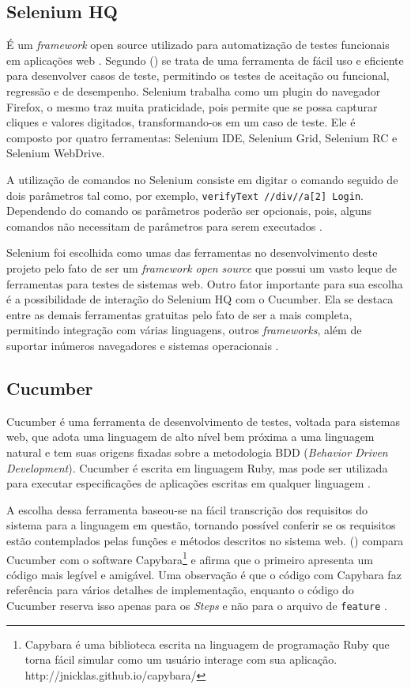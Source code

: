 \documentclass[tg]{mdtufsm}
\begin{document}
\subsection{Selenium HQ}
É um \emph{framework} open source utilizado para automatização de testes funcionais em aplicações web \cite{chiavegatto1desenvolvimento}. Segundo \citeauthor{pereiraestudoselenium} (\citeyear{pereiraestudoselenium}) se trata
de uma ferramenta de fácil uso e eficiente para desenvolver casos de teste, permitindo os testes de aceitação ou funcional, regressão e de desempenho.
Selenium trabalha como um plugin do navegador Firefox, o mesmo traz muita praticidade, pois permite que se possa capturar cliques e valores digitados, transformando-os em um caso de teste. Ele é composto por
quatro ferramentas: Selenium IDE, Selenium Grid, Selenium RC e Selenium WebDrive.

A utilização de comandos no Selenium consiste em digitar o comando seguido de dois parâmetros tal como, por exemplo, \texttt{verifyText //div//a[2] Login}. Dependendo  do comando os parâmetros poderão ser opcionais, pois, alguns comandos não necessitam de parâmetros para serem executados \cite{sixpenceautomatizaccao}.

Selenium foi escolhida como umas das ferramentas no desenvolvimento deste projeto pelo fato de ser um \emph{framework open source} que possui um vasto leque de ferramentas para testes de sistemas web. Outro fator
importante para sua escolha é a possibilidade de interação do Selenium HQ com o Cucumber. Ela se destaca entre as demais ferramentas gratuitas pelo fato de ser a mais completa, permitindo integração com
várias linguagens, outros \emph{frameworks}, além de suportar inúmeros navegadores e sistemas operacionais \cite{pereiraestudoselenium}.

\subsection{Cucumber}
Cucumber é uma ferramenta de desenvolvimento de testes, voltada para sistemas web, que adota uma linguagem de alto nível bem próxima a uma linguagem natural e tem suas origens fixadas sobre a metodologia BDD (\emph{Behavior Driven Development}). Cucumber
é escrita em linguagem Ruby, mas pode ser utilizada para executar especificações de aplicações escritas em qualquer linguagem \cite{nunescucumber}.

A escolha dessa ferramenta baseou-se na fácil transcrição dos requisitos do sistema para a linguagem em questão, tornando possível conferir se os requisitos estão contemplados pelas funções e métodos descritos no sistema web.
\citeauthor{lopescucumbervalor} (\citeyear{lopescucumbervalor}) compara Cucumber com o software Capybara\footnote{Capybara é uma biblioteca escrita na linguagem de programação Ruby que torna fácil simular como um usuário interage com sua aplicação. http://jnicklas.github.io/capybara/} e afirma que o primeiro apresenta um código mais legível e amigável. Uma observação é que o código com Capybara faz
referência para vários detalhes de implementação, enquanto o código do Cucumber reserva isso apenas para os \emph{Steps} e não para o arquivo de \texttt{feature} \cite{lopescucumbervalor}.
\end{document}
